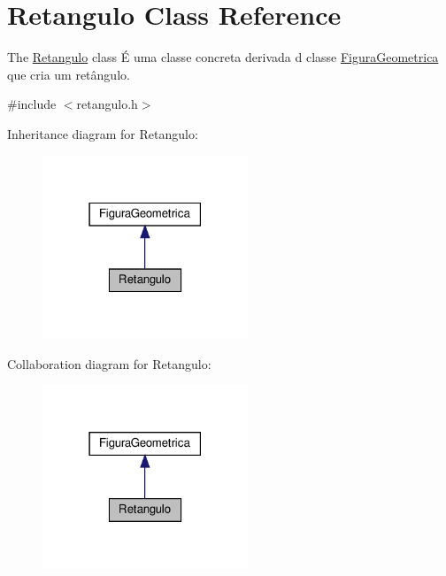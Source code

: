 \hypertarget{class_retangulo}{}\section{Retangulo Class Reference}
\label{class_retangulo}


The \hyperlink{class_retangulo}{Retangulo} class É uma classe concreta derivada d classe \hyperlink{class_figura_geometrica}{Figura\+Geometrica} que cria um retângulo.  




{\ttfamily \#include $<$retangulo.\+h$>$}



Inheritance diagram for Retangulo\+:
\nopagebreak
\begin{figure}[H]
\begin{center}
\leavevmode
\includegraphics[width=174pt]{class_retangulo__inherit__graph}
\end{center}
\end{figure}


Collaboration diagram for Retangulo\+:
\nopagebreak
\begin{figure}[H]
\begin{center}
\leavevmode
\includegraphics[width=174pt]{class_retangulo__coll__graph}
\end{center}
\end{figure}
